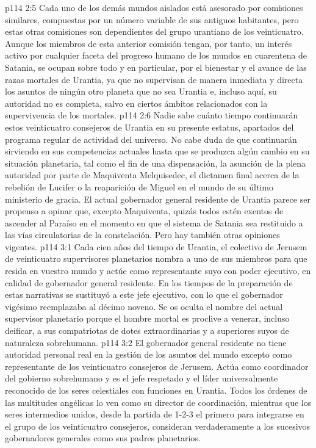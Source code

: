 \vs p114 2:5 Cada uno de los demás mundos aislados está asesorado por comisiones similares, compuestas por un número variable de sus antiguos habitantes, pero estas otras comisiones son dependientes del grupo urantiano de los veinticuatro. Aunque los miembros de esta anterior comisión tengan, por tanto, un interés activo por cualquier faceta del progreso humano de los mundos en cuarentena de Satania, se ocupan sobre todo y en particular, por el bienestar y el avance de las razas mortales de Urantia, ya que no supervisan de manera inmediata y directa los asuntos de ningún otro planeta que no sea Urantia e, incluso aquí, su autoridad no es completa, salvo en ciertos ámbitos relacionados con la supervivencia de los mortales.
\vs p114 2:6 Nadie sabe cuánto tiempo continuarán estos veinticuatro consejeros de Urantia en su presente estatus, apartados del programa regular de actividad del universo. No cabe duda de que continuarán sirviendo en sus competencias actuales hasta que se produzca algún cambio en su situación planetaria, tal como el fin de una dispensación, la asunción de la plena autoridad por parte de Maquiventa Melquisedec, el dictamen final acerca de la rebelión de Lucifer o la reaparición de Miguel en el mundo de su último ministerio de gracia. El actual gobernador general residente de Urantia parece ser propenso a opinar que, excepto Maquiventa, quizás todos estén exentos de ascender al Paraíso en el momento en que el sistema de Satania sea restituido a las vías circulatorias de la constelación. Pero hay también otras opiniones vigentes.
\vs p114 3:1 Cada cien años del tiempo de Urantia, el colectivo de Jerusem de veinticuatro supervisores planetarios nombra a uno de sus miembros para que resida en vuestro mundo y actúe como representante suyo con poder ejecutivo, en calidad de gobernador general residente. En los tiempos de la preparación de estas narrativas se sustituyó a este jefe ejecutivo, con lo que el gobernador vigésimo reemplazaba al décimo noveno. Se os oculta el nombre del actual supervisor planetario porque el hombre mortal es proclive a venerar, incluso deificar, a sus compatriotas de dotes extraordinarias y a superiores suyos de naturaleza sobrehumana.
\vs p114 3:2 El gobernador general residente no tiene autoridad personal real en la gestión de los asuntos del mundo excepto como representante de los veinticuatro consejeros de Jerusem. Actúa como coordinador del gobierno sobrehumano y es el jefe respetado y el líder universalmente reconocido de los seres celestiales con funciones en Urantia. Todos los órdenes de las multitudes angélicas lo ven como su director de coordinación, mientras que los seres intermedios unidos, desde la partida de 1\hyp{}2\hyp{}3 el primero para integrarse en el grupo de los veinticuatro consejeros, consideran verdaderamente a los sucesivos gobernadores generales como sus padres planetarios.
